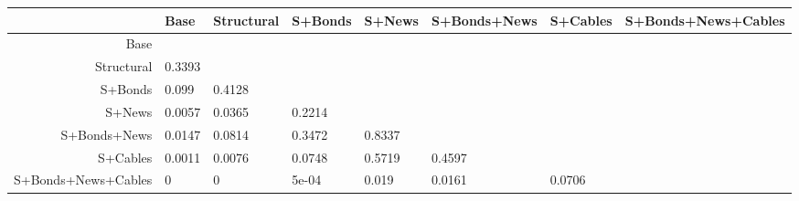 \begin{table}[ht]
\centering
\begin{tabular}{rlllllll}
  \hline
 & Base & Structural & S+Bonds & S+News & S+Bonds+News & S+Cables & S+Bonds+News+Cables \\ 
  \hline
Base &  &  &  &  &  &  &  \\ 
  Structural & 0.3393 &  &  &  &  &  &  \\ 
  S+Bonds & 0.099 & 0.4128 &  &  &  &  &  \\ 
  S+News & 0.0057 & 0.0365 & 0.2214 &  &  &  &  \\ 
  S+Bonds+News & 0.0147 & 0.0814 & 0.3472 & 0.8337 &  &  &  \\ 
  S+Cables & 0.0011 & 0.0076 & 0.0748 & 0.5719 & 0.4597 &  &  \\ 
  S+Bonds+News+Cables & 0 & 0 & 5e-04 & 0.019 & 0.0161 & 0.0706 &  \\ 
   \hline
\end{tabular}
\end{table}
